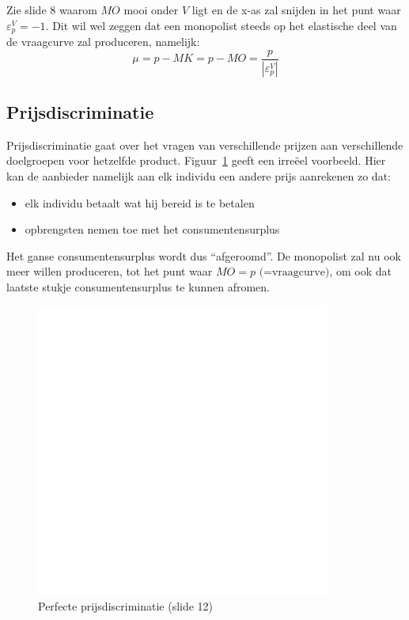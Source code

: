 Zie slide 8 waarom $MO$ mooi onder $V$ ligt en de x-as zal snijden in het punt waar $\varepsilon^V_p = -1$. Dit wil wel zeggen dat een monopolist steeds op het elastische deel van de vraagcurve zal produceren, namelijk:
\begin{equation}
   \mu = p - MK = p - MO = \frac{p}{|\varepsilon^V_p|}
\end{equation}


\subsection{Prijsdiscriminatie}
Prijsdiscriminatie gaat over het vragen van verschillende prijzen aan verschillende doelgroepen voor hetzelfde product. Figuur~\ref{fig:perfectePrijsDiscriminatie} geeft een irre\"eel voorbeeld. Hier kan de aanbieder namelijk aan elk individu een andere prijs aanrekenen zo dat:
\begin{itemize}
   \item elk individu betaalt wat hij bereid is te betalen
   \item opbrengsten nemen toe met het consumentensurplus
\end{itemize}
Het ganse consumentensurplus wordt dus ``afgeroomd''. De monopolist zal nu ook meer willen produceren, tot het punt waar $MO = p \text{ (=vraagcurve)}$, om ook dat laatste stukje consumentensurplus te kunnen afromen.
\begin{figure}[htbp]
   \centering
   \includegraphics[scale=0.4]{Images/white.png}
   \caption{Perfecte prijsdiscriminatie (slide 12)}
   \label{fig:perfectePrijsDiscriminatie}
\end{figure}

